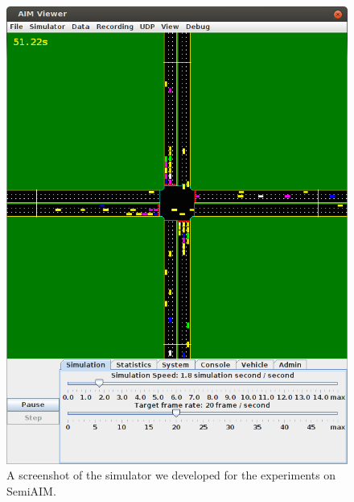 % 

\begin{figure}
\centering
\includegraphics[width=0.6\columnwidth]{figures/demo.png}
\vspace{-.1in}
\caption{A screenshot of the simulator we developed for the experiments on
SemiAIM.}
\label{fig:simulator}
\vspace{-.07in}
\end{figure}





